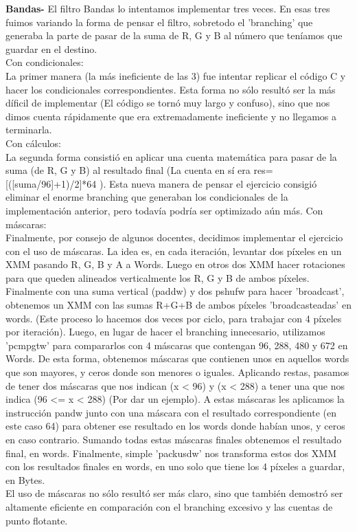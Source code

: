 \documentclass[a4paper]{article}
\begin{document}
\textbf{Bandas-}
El filtro Bandas lo intentamos implementar tres veces. En esas tres fuimos variando la forma de pensar el filtro, sobretodo el 'branching' que generaba la parte de pasar de la suma de R, G y B al n\'{u}mero que ten\'{i}amos que guardar en el destino.\\
Con condicionales: \\
La primer manera (la m\'{a}s ineficiente de las 3) fue intentar replicar el c\'{o}digo C y hacer los condicionales correspondientes. Esta forma no s\'{o}lo result\'{o} ser la m\'{a}s d\'{i}ficil de implementar (El c\'{o}digo se torn\'{o} muy largo y confuso), sino que nos dimos cuenta r\'{a}pidamente que era extremadamente ineficiente y no llegamos a terminarla. \\
Con c\'{a}lculos: \\
La segunda forma consisti\'{o} en aplicar una cuenta matem\'{a}tica para pasar de la suma (de R, G y B) al resultado final (La cuenta en s\'{i} era res=[([suma/96]+1)/2]*64 ). Esta nueva manera de pensar el ejercicio consigi\'{o} eliminar el enorme branching que generaban los condicionales de la implementaci\'{o}n anterior, pero todav\'{i}a podr\'{i}a ser optimizado a\'{u}n m\'{a}s.
Con m\'{a}scaras: \\
Finalmente, por consejo de algunos docentes, decidimos implementar el ejercicio con el uso de m\'{a}scaras. La idea es, en cada iteraci\'{o}n, levantar dos p\'{i}xeles en un XMM pasando R, G, B y A a Words. Luego en otros dos XMM hacer rotaciones para que queden alineados verticalmente los R, G y B de ambos p\'{i}xeles. Finalmente con una suma vertical (paddw) y dos pshufw para hacer 'broadcast', obtenemos un XMM con las sumas R+G+B de ambos p\'{i}xeles 'broadcasteadas' en words. (Este proceso lo hacemos dos veces por ciclo, para trabajar con 4 p\'{i}xeles por iteraci\'{o}n). Luego, en lugar de hacer el branching innecesario, utilizamos 'pcmpgtw' para compararlos con 4 m\'{a}scaras que contengan 96, 288, 480 y 672 en Words. De esta forma, obtenemos m\'{a}scaras que contienen unos en aquellos words que son mayores, y ceros donde son menores o iguales. Aplicando restas, pasamos de tener dos m\'{a}scaras que nos indican (x < 96) y (x < 288) a tener una que nos indica (96 <= x < 288) (Por dar un ejemplo). A estas m\'{a}scaras les aplicamos la instrucci\'{o}n pandw junto con una m\'{a}scara con el resultado correspondiente (en este caso 64) para obtener ese resultado en los words donde hab\'{i}an unos, y ceros en caso contrario. Sumando todas estas m\'{a}scaras finales obtenemos el resultado final, en words. Finalmente, simple 'packusdw' nos transforma estos dos XMM con los resultados finales en words, en uno solo que tiene los 4 p\'{i}xeles a guardar, en Bytes. \\
El uso de m\'{a}scaras no s\'{o}lo result\'{o} ser m\'{a}s claro, sino que tambi\'{e}n demostr\'{o} ser altamente eficiente en comparaci\'{o}n con el branching excesivo y las cuentas de punto flotante.
\end{document}
